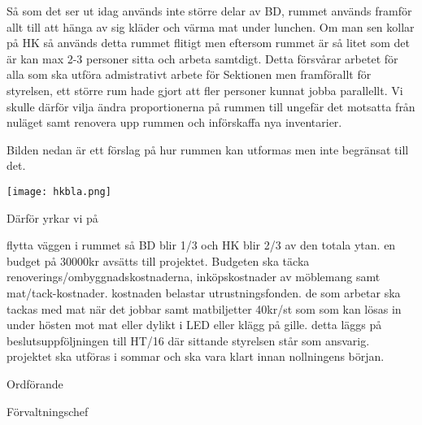 \documentclass[../_main/handlingar.tex]{subfiles}
\begin{document}

Så som det ser ut idag används inte större delar av BD, rummet används framför allt till att hänga av sig kläder och värma mat under lunchen. Om man sen kollar på HK så används detta rummet flitigt men eftersom rummet är så litet som det är kan max 2-3 personer sitta och arbeta samtdigt. Detta försvårar arbetet för alla som ska utföra admistrativt arbete för Sektionen men framförallt för styrelsen, ett större rum hade gjort att fler personer kunnat jobba parallellt. Vi skulle därför vilja ändra proportionerna på rummen till ungefär det motsatta från nuläget samt renovera upp rummen och införskaffa nya inventarier.

Bilden nedan är ett förslag på hur rummen kan utformas men inte begränsat till det.

\begin{center}
    \texttt{[image: hkbla.png]}
\end{center}

\newpage

Därför yrkar vi på
\begin{attsatser}
    \att flytta väggen i rummet så BD blir 1/3 och HK blir 2/3 av den totala ytan.
    \att en budget på 30000kr avsätts till projektet. Budgeten ska täcka renoverings/ombyggnadskostnaderna, inköpskostnader av möblemang samt mat/tack-kostnader.
    \att kostnaden belastar utrustningsfonden.
    \att de som arbetar ska tackas med mat när det jobbar samt matbiljetter 40kr/st som som kan lösas in under hösten mot mat eller dylikt i LED eller klägg på gille.
    \att detta läggs på beslutsuppföljningen till HT/16 där sittande styrelsen står som ansvarig.
    \att projektet ska utföras i sommar och ska vara klart innan nollningens början.
\end{attsatser}

\begin{signatures}{2}
    \ist
    \signature{Fredrik Peterson}{Ordförande}
    \signature{Anders Nilsson}{Förvaltningschef}
\end{signatures}
\end{document}
